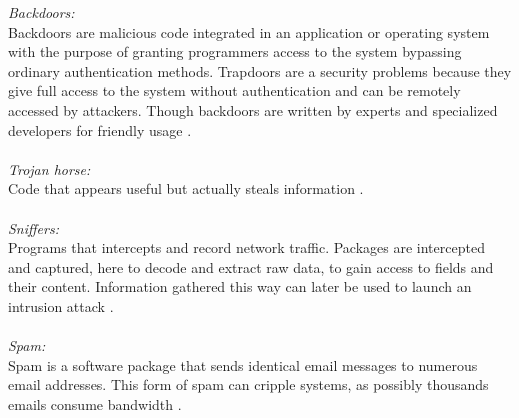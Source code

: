 \documentclass[12pt]{article} %
\begin{document}
\emph{Backdoors:} \\
Backdoors are malicious code integrated in an application or operating system with the purpose of granting programmers access to the system bypassing ordinary authentication methods. Trapdoors are a security problems because they give full access to the system without authentication and can be remotely accessed by attackers. Though backdoors are written by experts and specialized developers for friendly usage \cite{Asurveyonmalware}. \\ \\

\emph{Trojan horse:} \\
Code that appears useful but actually steals information \cite{Asurveyonmalware}. \\ \\

\emph{Sniffers:} \\
Programs that intercepts and record network traffic.  Packages are intercepted and captured, here to decode and extract raw data, to gain access to fields and their content. Information gathered this way can later be used to launch an intrusion attack \cite{Asurveyonmalware}. \\ \\

\emph{Spam:} \\
Spam is a software package that sends identical email messages to numerous email addresses. This form of spam can cripple systems, as possibly thousands emails consume bandwidth \cite{Asurveyonmalware}.  \\ \\
\end{document}
